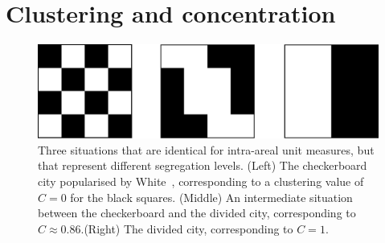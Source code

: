 \section{Clustering and concentration}
\label{sec:clustering_and_concentration}



\begin{figure}
    \centering
    \includegraphics[width=\textwidth]{./gfx/chapter-segregation/figure5.pdf}
    \caption{Three situations that are identical for intra-areal unit measures,
        but that represent different segregation levels. (Left) The checkerboard
        city popularised by White~\cite{White:1983}, corresponding to a
        clustering value of $C=0$ for the black squares. (Middle) An
        intermediate situation between the checkerboard and the divided city,
        corresponding to $C \approx 0.86$.(Right) The divided city, corresponding to
        $C=1$. \label{fig:checkerboard}} 
\end{figure}


